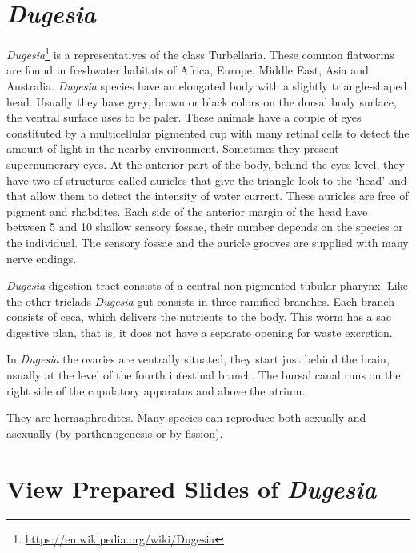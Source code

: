 \documentclass[]{book}
\let\rmarkdownfootnote\footnote%
\def\footnote{\protect\rmarkdownfootnote}
\renewcommand{\href}[2]{#2\footnote{\url{#1}}}
\theoremstyle{definition}
\theoremstyle{definition}
\theoremstyle{definition}
\theoremstyle{remark}
\begin{document}
\section{\texorpdfstring{\emph{Dugesia}}{Dugesia}}\label{dugesia}

\href{https://en.wikipedia.org/wiki/Dugesia}{\emph{Dugesia}} is a
representatives of the class Turbellaria. These common flatworms are
found in freshwater habitats of Africa, Europe, Middle East, Asia and
Australia. \emph{Dugesia} species have an elongated body with a slightly
triangle-shaped head. Usually they have grey, brown or black colors on
the dorsal body surface, the ventral surface uses to be paler. These
animals have a couple of eyes constituted by a multicellular pigmented
cup with many retinal cells to detect the amount of light in the nearby
environment. Sometimes they present supernumerary eyes. At the anterior
part of the body, behind the eyes level, they have two of structures
called auricles that give the triangle look to the `head' and that allow
them to detect the intensity of water current. These auricles are free
of pigment and rhabdites. Each side of the anterior margin of the head
have between 5 and 10 shallow sensory fossae, their number depends on
the species or the individual. The sensory fossae and the auricle
grooves are supplied with many nerve endings.

\emph{Dugesia} digestion tract consists of a central non-pigmented
tubular pharynx. Like the other triclads \emph{Dugesia} gut consists in
three ramified branches. Each branch consists of ceca, which delivers
the nutrients to the body. This worm has a sac digestive plan, that is,
it does not have a separate opening for waste excretion.

In \emph{Dugesia} the ovaries are ventrally situated, they start just
behind the brain, usually at the level of the fourth intestinal branch.
The bursal canal runs on the right side of the copulatory apparatus and
above the atrium.

They are hermaphrodites. Many species can reproduce both sexually and
asexually (by parthenogenesis or by fission).

\section{\texorpdfstring{View Prepared Slides of
\emph{Dugesia}}{View Prepared Slides of Dugesia}}\label{view-prepared-slides-of-dugesia}
\end{document}
